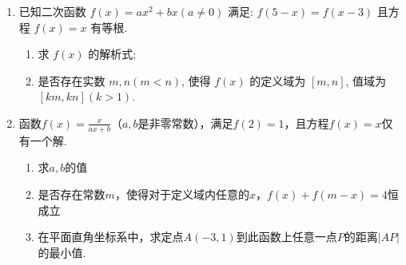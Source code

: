 \begin{enumerate}
\begin{jieda}
        \ps 本题转化不等式的时候一定要注意分类讨论
    \end{jieda}
    \item 已知二次函数 $f(x)=a x^2+b x(a \neq 0)$ 满足: $f(5-x)=f(x-3)$ 且方程 $f(x)=x$ 有等根. 
    \begin{enumerate}
    \item 求 $f(x)$ 的解析式;
    \item 是否存在实数 $m, n(m<n)$, 使得 $f(x)$ 的定义域为 $[m, n]$, 值域为 $[k m, k n](k>1)$.
    \end{enumerate}
    \begin{jieda}
    \end{jieda}
    \item 函数$f(x) = \frac{x}{ax+b}$（$a, b$是非零常数），满足$f(2) = 1$，且方程$f(x) = x$仅有一个解.
    \begin{enumerate}
        \item 求$a, b$的值
        \item 是否存在常数$m$，使得对于定义域内任意的$x$，$f(x) + f(m-x) = 4$恒成立
        \item 在平面直角坐标系中，求定点$A(-3, 1)$到此函数上任意一点$P$的距离$|AP|$的最小值.
    \end{enumerate}
    \begin{jieda}
        \begin{enumerate*}

\end{enumerate*}
\end{jieda}
\end{enumerate}
